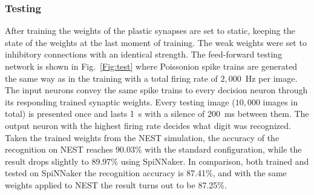 \subsubsection{Testing}
After training the weights of the plastic synapses are set to static, keeping the state of the weights at the last moment of training.
The weak weights were set to inhibitory connections with an identical strength.
The feed-forward testing network is shown in Fig.~\ref{Fig:test} where Poissonion spike trains are generated the same way as in the training with a total firing rate of $2,000$~Hz per image.
The input neurons convey the same spike trains to every decision neuron through its responding trained synaptic weights. 
Every testing image ($10,000$ images in total) is presented once and lasts 1~s with a silence of 200~ms between them.
The output neuron with the highest firing rate decides what digit was recognized.
Taken the trained weights from the NEST simulation, the accuracy of the recognition on NEST reaches 90.03\% with the standard configuration, while the result drops slightly to 89.97\% using SpiNNaker.
In comparison, both trained and tested on SpiNNaker the recognition accuracy is 87.41\%, and with the same weights applied to NEST the result turns out to be 87.25\%. 


%
